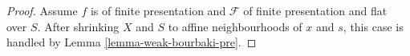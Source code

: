 \begin{proof}
\medskip\noindent
Assume $f$ is of finite presentation and
$\mathcal{F}$ of finite presentation and flat over $S$.
After shrinking $X$ and $S$ to affine neighbourhoods
of $x$ and $s$, this case is handled by
Lemma \ref{lemma-weak-bourbaki-pre}.
\end{proof}

